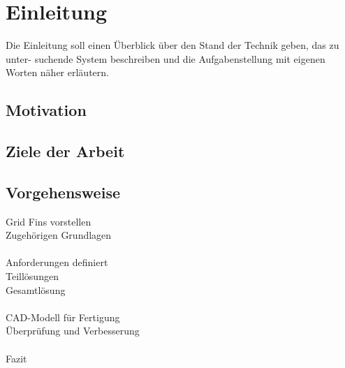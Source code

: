 \chapter{Einleitung}

Die Einleitung soll einen Überblick über den Stand der Technik geben, das zu unter-
suchende System beschreiben und die Aufgabenstellung mit eigenen Worten näher
erläutern.

\section{Motivation}

\section{Ziele der Arbeit}

\section{Vorgehensweise}

Grid Fins vorstellen\\
Zugehörigen Grundlagen\\
~\\
Anforderungen definiert\\
Teillösungen\\
Gesamtlösung\\
~\\
CAD-Modell für Fertigung\\
Überprüfung und Verbesserung\\
~\\
Fazit\\